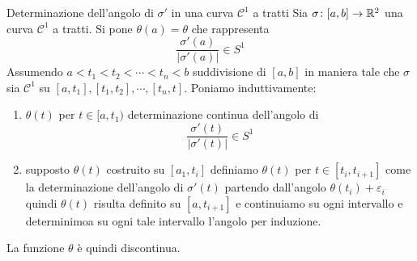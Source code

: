 \documentclass[a4paper]{article}
\begin{document}
\begin{snippetdefinition}{Determinazione dell'angolo di \(\sigma'\) in una curva \(\mathcal C^1\) a tratti}
    Sia \(\sigma \colon [a,b] \to \mathbb{R}^2\) una curva \(\mathcal C^1\) a tratti.
    Si pone \(\theta(a) = \theta\) che rappresenta
    \[
        \frac{\sigma'(a)}{|\sigma'(a)|} \in S^1
    \]
    Assumendo \(a < t_1 < t_2 < \cdots < t_n < b\)
    suddivisione di \([a,b]\)
    in maniera tale che \(\sigma\) sia \(\mathcal C^1\)
    su \([a,t_1], [t_1, t_2], \cdots, [t_n, t]\).
    Poniamo induttivamente:
    \begin{enumerate}
        \item \(\theta(t)\) per \(t \in [a, t_1)\)
        determinazione continua dell'angolo di
        \[
            \frac{\sigma'(t)}{|\sigma'(t)|} \in S^1
        \]
        \item supposto \(\theta(t)\) costruito su \([a_1, t_i]\)
        definiamo \(\theta(t)\) per \(t \in [t_i, t_{i+1}]\)
        come la determinazione dell'angolo di \(\sigma'(t)\)
        partendo dall'angolo \(\theta(t_i) + \varepsilon_i\)
        quindi \(\theta(t)\) risulta definito su \([a, t_{i+1}]\)
        e continuiamo su ogni intervallo e determinimoa su ogni tale intervallo l'angolo
        per induzione.
    \end{enumerate}
\end{snippetdefinition}

La funzione \(\theta\) è quindi discontinua.
\end{document}
